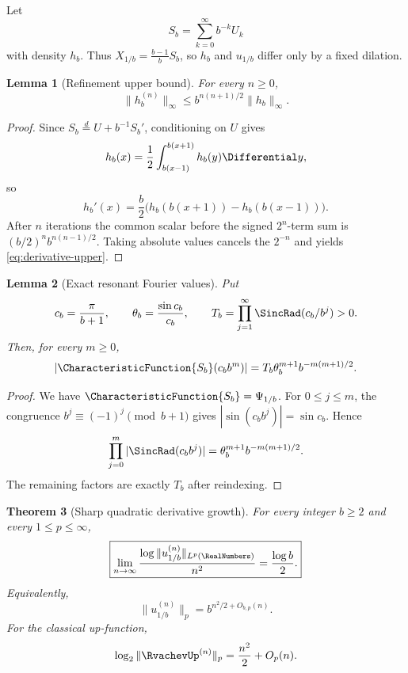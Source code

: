 \documentclass[11pt,oneside]{article}
\newtheorem{theorem}{Theorem}[section]
\newtheorem{lemma}[theorem]{Lemma}
\theoremstyle{definition}
\theoremstyle{remark}
\begin{document}
Let
\begin{equation}
 S_b=\sum_{k=0}^{\infty}b^{-k}U_k
 \label{eq:Sb}
\end{equation}
with density $h_b$.  Thus $X_{1/b}=\frac{b-1}{b}S_b$, so $h_b$ and $u_{1/b}$ differ
only by a fixed dilation.

\begin{lemma}[Refinement upper bound]
\label{lem:derivative-upper}
For every $n\ge0$,
\begin{equation}
 \|h_b^{(n)}\|_\infty
 \le b^{n(n+1)/2}\|h_b\|_\infty.
 \label{eq:derivative-upper}
\end{equation}
\end{lemma}

\begin{proof}
Since $S_b\overset d=U+b^{-1}S_b'$, conditioning on $U$ gives
\[
 h_b(x)=\frac12\int_{b(x-1)}^{b(x+1)}h_b(y)\Differential y,
\]
so
\[
 h_b'(x)=\frac b2\bigl(h_b(b(x+1))-h_b(b(x-1))\bigr).
\]
After $n$ iterations the common scalar before the signed $2^n$-term sum is
$(b/2)^n b^{n(n-1)/2}$.  Taking absolute values cancels the $2^{-n}$ and yields
\eqref{eq:derivative-upper}.
\end{proof}

\begin{lemma}[Exact resonant Fourier values]
\label{lem:resonant-values}
Put
\[
 c_b=\frac{\pi}{b+1},\qquad
 \theta_b=\frac{\sin c_b}{c_b},\qquad
 T_b=\prod_{j=1}^{\infty}\SincRad(c_b/b^j)>0.
\]
Then, for every $m\ge0$,
\begin{equation}
 \left|\CharacteristicFunction{S_b}(c_bb^m)\right|
 =T_b\theta_b^{m+1}b^{-m(m+1)/2}.
 \label{eq:resonant-fourier}
\end{equation}
\end{lemma}

\begin{proof}
We have $\CharacteristicFunction{S_b}=\Psi_{1/b}$.  For $0\le j\le m$, the congruence
$b^j\equiv(-1)^j\pmod{b+1}$ gives
$|\sin(c_bb^j)|=\sin c_b$.  Hence
\[
 \prod_{j=0}^{m}|\SincRad(c_bb^j)|
 =\theta_b^{m+1}b^{-m(m+1)/2}.
\]
The remaining factors are exactly $T_b$ after reindexing.
\end{proof}

\begin{theorem}[Sharp quadratic derivative growth]
\label{thm:sharp-derivative-growth}
For every integer $b\ge2$ and every $1\le p\le\infty$,
\begin{equation}
 \boxed{
 \lim_{n\to\infty}
 \frac{\log\|u_{1/b}^{(n)}\|_{L^p(\RealNumbers)}}{n^2}
 =\frac{\log b}{2}.}
 \label{eq:sharp-derivative-growth}
\end{equation}
Equivalently,
\[
 \|u_{1/b}^{(n)}\|_p=b^{n^2/2+O_{b,p}(n)}.
\]
For the classical up-function,
\begin{equation}
 \log_2\|\RvachevUp^{(n)}\|_p=\frac{n^2}{2}+O_p(n).
 \label{eq:up-derivative-growth}
\end{equation}
\end{theorem}
\end{document}
